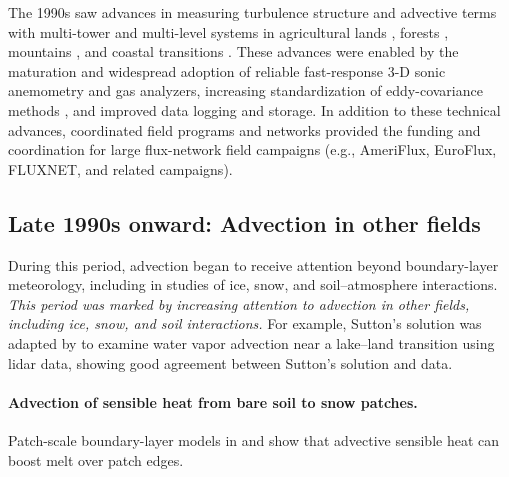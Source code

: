 \documentclass{article}
\begin{document}
    The 1990s saw advances in measuring turbulence structure and advective terms with multi-tower and multi-level systems 
    in agricultural lands \cite{baldocchi_intra-field_1995} , 
    forests \cite{staebler2004observing}, 
    mountains \cite{hammerle2007eddy, yi2008contribution}, and 
    coastal transitions \citep{allen2007satellite, rey-sanchez_evaporation_2017}.
    These advances were enabled by the 
    maturation and widespread adoption of reliable fast-response 3-D sonic anemometry and gas analyzers,
    increasing standardization of eddy-covariance methods \cite{fisher_ecostress_2020},
    and improved data logging and storage.
    In addition to these technical advances, coordinated field programs and networks provided the funding and coordination for  large flux-network field campaigns (e.g., AmeriFlux, EuroFlux, FLUXNET, and related campaigns).
    
    
    \subsection{Late 1990s onward: Advection in other fields }
    
    During this period, advection began to receive attention beyond boundary-layer meteorology, including in studies of ice, snow, and soil–atmosphere interactions.
    \textit{This period was marked by increasing attention to advection in other fields, including ice, snow, and soil interactions. }
    For example, Sutton's solution  was  adapted by  \citet{higgins2013measured} to examine water vapor advection near a lake–land transition using lidar data, showing good agreement between Sutton's solution and data.   
    
    \paragraph{Advection of sensible heat from bare soil to snow patches.}
    Patch-scale boundary-layer models in \citet{shook_snowmelt_1997} and \citet{essery_boundarylayer_2006} show that advective sensible heat can boost melt over patch edges.
    
    
\end{document}
